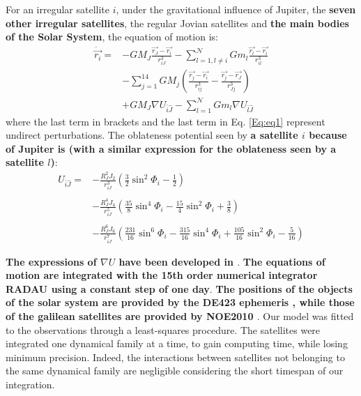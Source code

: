\documentclass[useAMS,usenatbib]{mn2e}
\begin{document}
For an irregular satellite $i$, under the gravitational influence of Jupiter, the \textbf{seven other irregular satellites}, the regular Jovian satellites and\textbf{ the main bodies of the Solar System}, the equation of motion is:
\begin{equation}
\label{Eq:eq1}
\begin{array}{ll}

\ddot{\vec{r_i}}= & \displaystyle -GM_J\frac{\vec{r_J}-\vec{r_i}}{r_{iJ}^3}-\sum_{l=1,l\neq i}^\mathcal{N} Gm_l\frac{\vec{r_l}-\vec{r_i}}{r_{il}^3}\\
&\displaystyle -\sum_{j=1}^{14}GM_j \left(\frac{\vec{r_j}-\vec{r_i}}{r_{ij}^3} - \frac{\vec{r_j}-\vec{r_J}}{r_{Jj}^3} \right)\\
 & \displaystyle +GM_J \nabla U_{\bar{i}\hat{J}} -\sum_{l=1}^\mathcal{N} Gm_l\nabla U_{\bar{l}\hat{J}}
\end{array}
\end{equation}
where the last term in brackets and the last term in Eq. \ref{Eq:eq1} represent undirect perturbations. The oblateness potential seen by \textbf{a satellite $i$ because of Jupiter is (with a similar expression for the oblateness seen by a satellite $l$)}:
\begin{equation}\begin{array}{ll}

U_{\bar{i}\hat{J}}=&\displaystyle -\frac{R_J^2 J_2}{r_{iJ}^3}\left(\frac{3}{2}\sin^2 \Phi_i-\frac{1}{2}\right)\\ &\\ &
\displaystyle-\frac{R_J^4 J_4}{r_{iJ}^5}\left(\frac{35}{8}\sin^4 \Phi_i-\frac{15}{4}\sin^2 \Phi_i+\frac{3}{8}\right)\\
& \\
&\displaystyle-\frac{R_J^6 J_6}{r_{iJ}^7}\left(\frac{231}{16}\sin^6 \Phi_i-\frac{315}{16}\sin^4 \Phi_i+\frac{105}{16}\sin^2 \Phi_i-\frac{5}{16}\right)

\end{array}
\end{equation}

\textbf{The expressions of $\nabla U$ have been developed in \cite{Lainey2004}}. \textbf{The equations of motion are integrated with the 15th order numerical integrator RADAU \citep{Everhart1985} using a constant step of one day}. \textbf{The positions of the objects of the solar system are provided by the DE423 ephemeris \citep{Folkner2010}, while those of the galilean satellites are provided by NOE2010 \citep{Lainey2004}}.
Our model was fitted to the observations through a least-squares procedure. The satellites were integrated one dynamical family at a time, to gain computing time, while losing minimum precision. Indeed, the interactions between satellites not belonging to the same dynamical family are negligible considering the short timespan of our integration. 
\end{document}
